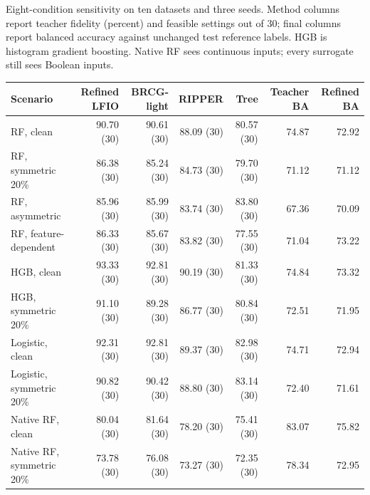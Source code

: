 \begin{kbtable}
\centering
\caption{Eight-condition sensitivity on ten datasets and three seeds. Method columns report teacher fidelity (percent) and feasible settings out of 30; final columns report balanced accuracy against unchanged test reference labels. HGB is histogram gradient boosting. Native RF sees continuous inputs; every surrogate still sees Boolean inputs.}
\label{tab:strength_sensitivity}
\small
\begin{adjustbox}{max width=\linewidth}
\begin{tabular}{lrrrrrr}
\toprule
Scenario & Refined LFIO & BRCG-light & RIPPER & Tree & Teacher BA & Refined BA \\
\midrule
RF, clean & 90.70 (30) & 90.61 (30) & 88.09 (30) & 80.57 (30) & 74.87 & 72.92 \\
RF, symmetric 20\% & 86.38 (30) & 85.24 (30) & 84.73 (30) & 79.70 (30) & 71.12 & 71.12 \\
RF, asymmetric & 85.96 (30) & 85.99 (30) & 83.74 (30) & 83.80 (30) & 67.36 & 70.09 \\
RF, feature-dependent & 86.33 (30) & 85.67 (30) & 83.82 (30) & 77.55 (30) & 71.04 & 73.22 \\
HGB, clean & 93.33 (30) & 92.81 (30) & 90.19 (30) & 81.33 (30) & 74.84 & 73.32 \\
HGB, symmetric 20\% & 91.10 (30) & 89.28 (30) & 86.77 (30) & 80.84 (30) & 72.51 & 71.95 \\
Logistic, clean & 92.31 (30) & 92.81 (30) & 89.37 (30) & 82.98 (30) & 74.71 & 72.94 \\
Logistic, symmetric 20\% & 90.82 (30) & 90.42 (30) & 88.80 (30) & 83.14 (30) & 72.40 & 71.61 \\
Native RF, clean & 80.04 (30) & 81.64 (30) & 78.20 (30) & 75.41 (30) & 83.07 & 75.82 \\
Native RF, symmetric 20\% & 73.78 (30) & 76.08 (30) & 73.27 (30) & 72.35 (30) & 78.34 & 72.95 \\
\bottomrule
\end{tabular}
\end{adjustbox}
\end{kbtable}

